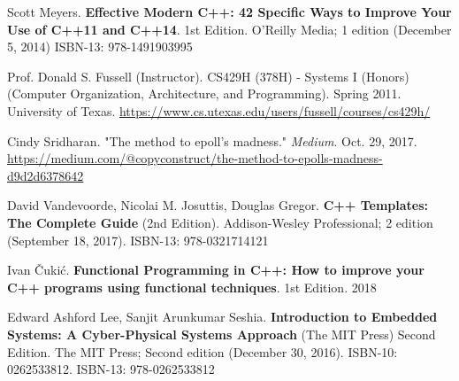 \documentclass[10pt]{amsart}
\begin{document}
\begin{thebibliography}{9}
Scott Meyers.  \textbf{Effective Modern C++: 42 Specific Ways to Improve Your Use of C++11 and C++14}. 1st Edition.  O'Reilly Media; 1 edition (December 5, 2014)  ISBN-13: 978-1491903995

Prof. Donald S. Fussell (Instructor). CS429H (378H) - Systems I (Honors) (Computer Organization, Architecture, and Programming). Spring 2011. University of Texas. \url{https://www.cs.utexas.edu/users/fussell/courses/cs429h/}

 Cindy Sridharan. "The method to epoll's madness." \emph{Medium}. Oct. 29, 2017. \url{https://medium.com/@copyconstruct/the-method-to-epolls-madness-d9d2d6378642}

David Vandevoorde, Nicolai M. Josuttis, Douglas Gregor. \textbf{C++ Templates: The Complete Guide} (2nd Edition). Addison-Wesley Professional; 2 edition (September 18, 2017). ISBN-13: 978-0321714121

Ivan \v{C}uki\'{c}. \textbf{Functional Programming in C++: How to improve your C++ programs using functional techniques}. 1st Edition. 2018

Edward Ashford Lee, Sanjit Arunkumar Seshia. \textbf{Introduction to Embedded Systems: A Cyber-Physical Systems Approach} (The MIT Press) Second Edition. The MIT Press; Second edition (December 30, 2016). ISBN-10: 0262533812. ISBN-13: 978-0262533812


\end{thebibliography}
\end{document}

